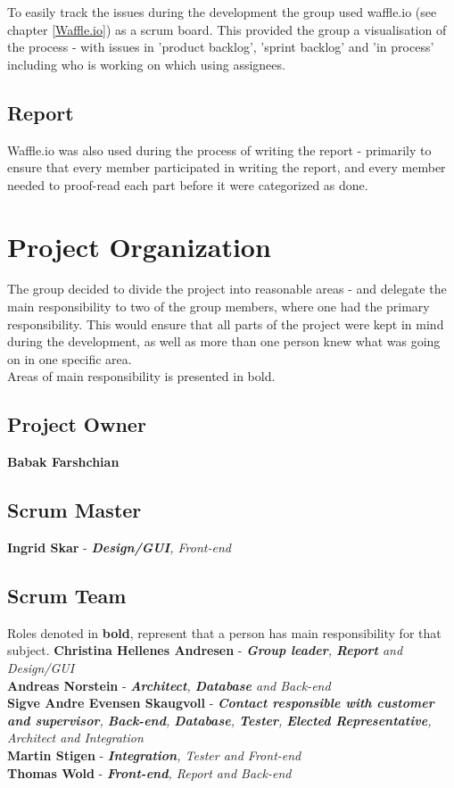 To easily track the issues during the development the group used waffle.io (see chapter  \ref{Waffle.io}) as a scrum board. This provided the group a visualisation of the process - with issues in 'product backlog', 'sprint backlog' and 'in process' including who is working on which using assignees. 

\subsection{Report}
Waffle.io was also used during the process of writing the report - primarily to ensure that every member participated in writing the report, and every member needed to proof-read each part before it were categorized as done.  


\section{Project Organization}\label{projectOrganisation}
The group decided to divide the project into reasonable areas - and delegate the main responsibility to two of the group members, where one had the primary responsibility. This would ensure that all parts of the project were kept in mind during the development, as well as more than one person knew what was going on in one specific area.\\
Areas of main responsibility is presented in bold.

\subsection{Project Owner}
\textbf{Babak Farshchian}

\subsection{Scrum Master}
\textbf{Ingrid Skar} - \emph{\textbf{Design/GUI}, Front-end}

\subsection{Scrum Team}
Roles denoted in \textbf{bold}, represent that a person has main responsibility for that subject.
\textbf{Christina Hellenes Andresen} - \emph{\textbf{Group leader}, \textbf{Report} and Design/GUI}\\
\noindent \textbf{Andreas Norstein} - \emph{\textbf{Architect}, \textbf{Database} and Back-end}\\
\noindent \textbf{Sigve Andre Evensen Skaugvoll} - \emph{\textbf{Contact responsible with customer and supervisor}, \textbf{Back-end}, \textbf{Database}, \textbf{Tester}, \textbf{Elected Representative}, Architect and Integration}\\
\noindent \textbf{Martin Stigen} - \emph{\textbf{Integration}, Tester and Front-end} \\
\noindent \textbf{Thomas Wold} - \emph{\textbf{Front-end}, Report and Back-end}\\ 

